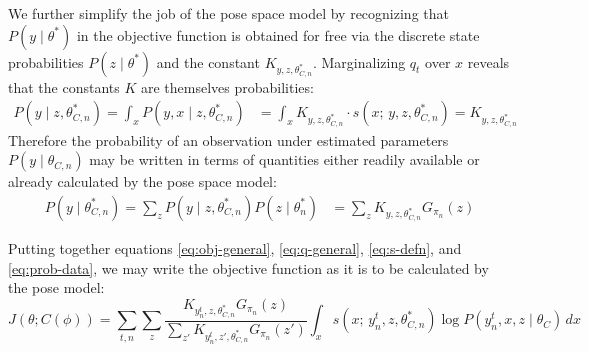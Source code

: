 \documentclass{article}         %
\begin{document}
We further simplify the job of the pose space model by recognizing that $P(y \mid \theta^*)$ in the objective function is obtained for free via the discrete state probabilities $P(z\mid \theta^*)$ and the constant $K_{y, z, \theta_{C, n}^*}$. Marginalizing $q_t$ over $x$ reveals that the constants $K$ are themselves probabilities:
\begin{align}
    P(y \mid z, \theta^*_{C, n}) = \int_x P(y, x \mid z, \theta^*_{C, n}) &= \int_x K_{y, z, \theta^*_{C, n}}\cdot s(x;\, y, z, \theta^*_{C, n}) = K_{y, z, \theta^*_{C, n}}
\end{align}
Therefore the probability of an observation under estimated parameters $P(y \mid \theta_{C, n})$ may be written in terms of quantities either readily available or already calculated by the pose space model:
\begin{align}
    P(y \mid \theta^*_{C, n}) = \sum_z P(y \mid z, \theta^*_{C, n}) P(z \mid \theta^*_{n}) &= \sum_z K_{y, z, \theta^*_{C, n}} G_{\pi_n}(z)
    \label{eq:prob-data}
\end{align}

Putting together equations \ref{eq:obj-general}, \ref{eq:q-general}, \ref{eq:s-defn}, and \ref{eq:prob-data}, we may write the objective function as it is to be calculated by the pose model:
\begin{equation}
    J(\theta; C(\phi)) = \sum_{t, n}\sum_z  \frac{K_{y^t_n, z, \theta_{C, n}^*} G_{\pi_n}(z)}{\sum_{z'} K_{y^t_n, z', \theta_{C, n}^*}  G_{\pi_n}(z')} \int_x s(x;\, y^t_n, z, \theta^*_{C, n}) \log P(y^t_n, x, z \mid \theta_C) \, dx 
\end{equation}
\end{document}
